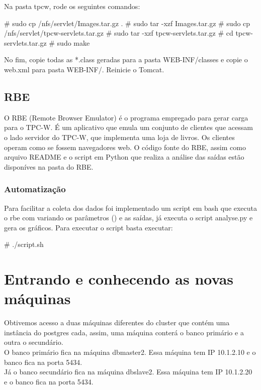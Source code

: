 \documentclass[a4paper,10pt]{article}
\begin{document}
        Na pasta tpcw, rode os seguintes comandos:
        \begin{spverbatim}
            # sudo cp /nfs/servlet/Images.tar.gz .
            # sudo tar -xzf Images.tar.gz
            # sudo cp /nfs/servlet/tpcw-servlets.tar.gz
            # sudo tar -xzf tpcw-servlets.tar.gz
            # cd tpcw-servlets.tar.gz
            # sudo make
        \end{spverbatim}

        No fim, copie todas as *.class geradas para a pasta WEB-INF/classes e copie o web.xml para pasta WEB-INF/. Reinicie o Tomcat.

       \subsection{RBE}
        O RBE (Remote Browser Emulator) é o programa empregado para gerar carga para o TPC-W. É um aplicativo que emula um conjunto de clientes que acessam o lado servidor do TPC-W, que implementa uma loja de livros. Os clientes operam como se fossem navegadores web.
        O código fonte do RBE, assim como arquivo README e o script em Python que realiza a análise das saídas estão disponíves na pasta do RBE.

        \subsubsection{Automatização}
        Para facilitar a coleta dos dados foi implementado um script em bash que executa o rbe com variando os parâmetros () e as saídas, já executa o script analyse.py e gera os gráficos.
        Para executar o script basta executar:
        \begin{spverbatim}
        # ./script.sh
        \end{spverbatim}

\section{Entrando e conhecendo as novas máquinas}
    Obtivemos acesso a duas máquinas diferentes do cluster que contém uma instância do postgres cada, assim, uma máquina conterá o banco primário e a outra o secundário.\\
    O banco primário fica na máquina dbmaster2. Essa máquina tem IP 10.1.2.10 e o banco fica na porta 5434.\\
    Já o banco secundário fica na máquina dbslave2. Essa máquina tem IP 10.1.2.20 e o banco fica na porta 5434.
\end{document}
